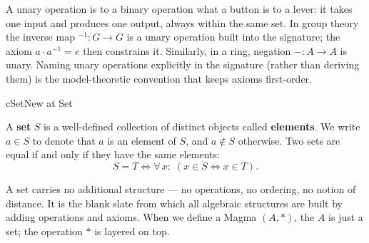 \begin{remark}
  A unary operation is to a binary operation what a button is to a lever:
  it takes one input and produces one output, always within the same set.
  In group theory the inverse map ${}^{-1} : G \to G$ is a unary operation
  built into the signature; the axiom $a \cdot a^{-1} = e$ then constrains
  it.  Similarly, in a ring, negation $- : A \to A$ is unary.  Naming
  unary operations explicitly in the signature (rather than deriving them)
  is the model-theoretic convention that keeps axioms first-order.
\end{remark}

\clearpage


\clearpage\thispagestyle{plain}

\begin{bpnew}{cSet}{New at Set}
\end{bpnew}

\begin{definition}[Set]
\label{def:formal-model-theoretic-structures-l235}
  A \textbf{set} $S$ is a well-defined collection of distinct objects called
  \textbf{elements}.  We write $a \in S$ to denote that $a$ is an element of
  $S$, and $a \notin S$ otherwise.  Two sets are equal if and only if they
  have the same elements:
  \[
    S = T \iff \forall\,x:\; (x \in S \iff x \in T).
  \]
\end{definition}

\begin{remark}
  A set carries no additional structure --- no operations, no ordering, no notion
  of distance.  It is the blank slate from which all algebraic structures are
  built by adding operations and axioms.  When we define a Magma $(A, *)$,
  the $A$ is just a set; the operation $*$ is layered on top.
\end{remark}



\clearpage\thispagestyle{plain}

